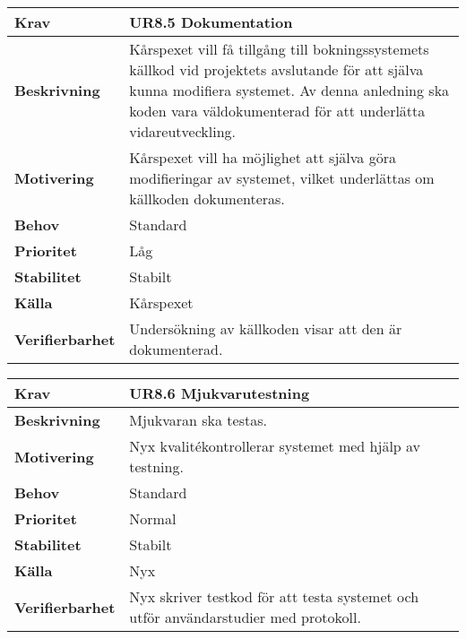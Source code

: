 \documentclass[a4paper, twoside, 11pt, titlepage]{article}
\begin{document}
		\begin {table} [ht] \begin{tabular} { p{2.6cm} p{12.5cm} }
			\hline
			{\sffamily\textbf{Krav}} & {\sffamily\textbf{UR8.5 Dokumentation}} \\
			\hline
			{\sffamily\textbf{Beskrivning}} & {Kårspexet vill få tillgång till bokningssystemets källkod vid projektets avslutande för att själva kunna modifiera systemet. Av denna anledning ska koden vara väldokumenterad för att underlätta vidareutveckling.} \\
			\hline
			{\sffamily\textbf{Motivering}} & {Kårspexet vill ha möjlighet att själva göra modifieringar av systemet, vilket underlättas om källkoden dokumenteras.} \\
			\hline
			{\sffamily\textbf{Behov}} & {Standard} \\
			\hline
			{\sffamily\textbf{Prioritet}} & {Låg} \\
			\hline
			{\sffamily\textbf{Stabilitet}} & {Stabilt} \\
			\hline
			{\sffamily\textbf{Källa}} & {Kårspexet} \\
			\hline
			{\sffamily\textbf{Verifierbarhet}} & {Undersökning av källkoden visar att den är dokumenterad.} \\
			\hline
		\end{tabular} \end{table} \FloatBarrier
		\vspace{6mm}

		\begin {table} [ht] \begin{tabular} { p{2.6cm} p{12.5cm} }
			\hline
			{\sffamily\textbf{Krav}} & {\sffamily\textbf{UR8.6 Mjukvarutestning}} \\
			\hline
			{\sffamily\textbf{Beskrivning}} & {Mjukvaran ska testas.} \\
			\hline
			{\sffamily\textbf{Motivering}} & {Nyx kvalitékontrollerar systemet med hjälp av testning.} \\
			\hline
			{\sffamily\textbf{Behov}} & {Standard} \\
			\hline
			{\sffamily\textbf{Prioritet}} & {Normal} \\
			\hline
			{\sffamily\textbf{Stabilitet}} & {Stabilt} \\
			\hline
			{\sffamily\textbf{Källa}} & {Nyx} \\
			\hline
			{\sffamily\textbf{Verifierbarhet}} & {Nyx skriver testkod för att testa systemet och utför användarstudier med protokoll.} \\
			\hline
		\end{tabular} \end{table} \FloatBarrier
\end{document}
